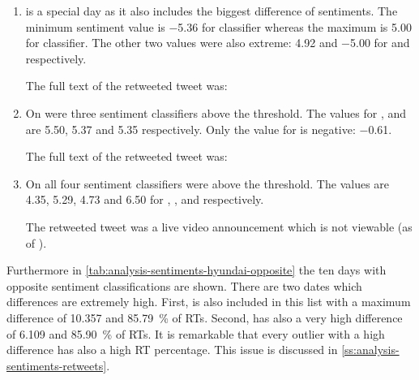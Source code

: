 \begin{enumerate}
    \item 
         is a special day as it also includes the biggest difference of sentiments.
        The minimum sentiment value is \num{-5.36} for \nb{} classifier whereas the maximum is \num{5.00} for \me{} classifier.
        The other two values were also extreme: \num{4.92} and \num{-5.00} for \tb{} and \svm{} respectively.


        The full text of the retweeted tweet was:

    \item
        On  were three sentiment classifiers above the threshold.
        The values for \tb{}, \nb{} and \me{} are \num{5.50}, \num{5.37} and \num{5.35} respectively.
        Only the value for \svm{} is negative: \num{-0.61}.


        The full text of the retweeted tweet was:

    \item
        On  all four sentiment classifiers were above the threshold.
        The values are \num{4.35}, \num{5.29}, \num{4.73} and \num{6.50} for \ftb{}, \fnb{}, \fme{} and \fsvm{} respectively.

        The retweeted tweet was a live video announcement which is not viewable (as of ).
\end{enumerate}

\begin{figure}[hbt]
    \centering
    
    \caption{\sentimentsCaption{\hyundai}}
    \label{fig:analysis-sentiments-hyundai}
\end{figure} 

Furthermore in \cref{tab:analysis-sentiments-hyundai-opposite} the ten days with opposite sentiment classifications are shown.
There are two dates which differences are extremely high.
First,  is also included in this list with a maximum difference of \num{10.357} and \SI{85.79}{\percent} of \acp{RT}.
Second,  has also a very high difference of \num{6.109} and \SI{85.90}{\percent} of \acp{RT}.
It is remarkable that every outlier with a high difference has also a high \ac{RT} percentage.
This issue is discussed in \cref{ss:analysis-sentiments-retweets}.

